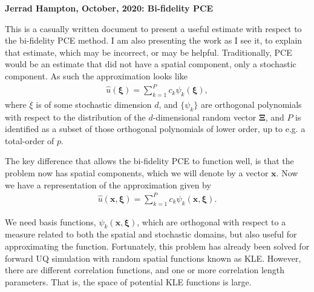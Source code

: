 \documentclass{report}
\begin{document}
\begin{center}
\bf{Jerrad Hampton, October, 2020: Bi-fidelity PCE}
\end{center}
This is a casually written document to present a useful estimate with respect to the bi-fidelity PCE method. I am also presenting the work as I see it, to explain that estimate, which may be incorrect, or may be helpful. Traditionally, PCE would be an estimate that did not have a spatial component, only a stochastic component. As such the approximation looks like
\begin{align}
\label{eq:pce_old}
\hat{u}(\bm{\xi}) = \mathop{\sum}\limits_{k=1}^{P}c_k\psi_k(\bm{\xi}), 
\end{align}
where $\xi$ is of some stochastic dimension $d$, and $\{\psi_k\}$ are orthogonal polynomials with respect to the distribution of the $d$-dimensional random vector $\bm{\Xi}$, and $P$ is identified as a subset of those orthogonal polynomials of lower order, up to e.g. a total-order of $p$.

The key difference that allows the bi-fidelity PCE to function well, is that the problem now has spatial components, which we will denote by a vector $\bm{x}$. Now we have a representation of the approximation given by
\begin{align}
\label{eq:pce_new}
\hat{u}(\bm{x},\bm{\xi}) = \mathop{\sum}\limits_{k=1}^{P}c_k\psi_k(\bm{x},\bm{\xi}).
\end{align}

We need basis functions, $\psi_k(\bm{x},\bm{\xi})$, which are orthogonal with respect to a measure related to both the spatial and stochastic domains, but also useful for approximating the function. Fortunately, this problem has already been solved for forward UQ simulation with random spatial functions known as KLE. However, there are different correlation functions, and one or more correlation length parameters. That is, the space of potential KLE functions is large. 
\end{document}
